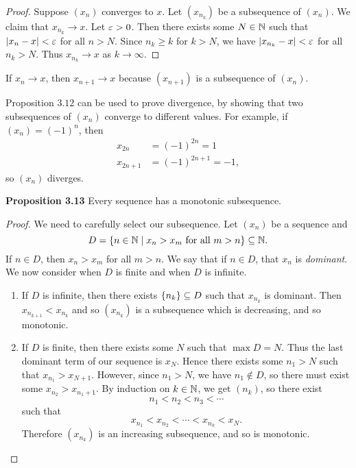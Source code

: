 \documentclass[class=article, crop=false]{standalone}
\begin{document}
  \begin{proof}
    Suppose $(x_n)$ converges to $x$. Let $(x_{n_k})$ be a subsequence of $(x_n)$. We claim that $x_{n_k}\to x$. Let $\varepsilon > 0$. Then there exists some $N\in\mathbb{N}$ such that $\left\lvert x_n - x \right\rvert < \varepsilon$ for all $n > N$. Since $n_k\geq k$ for $k > N$, we have $\left\lvert x_{n_k} - x \right\rvert < \varepsilon$ for all $n_k > N$. Thus $x_{n_k}\to x$ as $k\to \infty$.
  \end{proof}
  \begin{note}{}
    If $x_n\to x$, then $x_{n + 1}\to x$ because $(x_{n + 1})$ is a subsequence of $(x_n)$.
  \end{note}
  \begin{note}{}
    Proposition $3.12$ can be used to prove divergence, by showing that two subsequences of $(x_n)$ converge to different values. For example, if $(x_n) = (-1)^n$, then
    \begin{align*}
      x_{2n} &= (-1)^{2n} = 1 \\
      x_{2n + 1} &= (-1)^{2n + 1} = -1,
    \end{align*}
    so $(x_n)$ diverges.
  \end{note}
  \textbf{Proposition 3.13} Every sequence has a monotonic subsequence.
  \begin{proof}
    We need to carefully select our subsequence. Let $(x_n)$ be a sequence and
    \[
      D = \left\{n\in\mathbb{N} \mid x_n > x_m \text{ for all }m > n\right\}\subseteq \mathbb{N}.
    \]
    If $n\in D$, then $x_n > x_m$ for all $m > n$. We say that if $n\in D$, that $x_n$ is \emph{dominant}. We now consider when $D$ is finite and when $D$ is infinite.
    \begin{enumerate}
      \item If $D$ is infinite, then there exists $\left\{n_k\right\}\subseteq D$ such that $x_{n_k}$ is dominant. Then $x_{n_{k + 1}} < x_{n_k}$ and so $(x_{n_k})$ is a subsequence which is decreasing, and so monotonic.
      \item If $D$ is finite, then there exists some $N$ such that $\max D = N$. Thus the last dominant term of our sequence is $x_N$. Hence there exists some $n_1 > N$ such that $x_{n_1} > x_{N + 1}$. However, since $n_1 > N$, we have $n_1\notin D$, so there must exist some $x_{n_2} > x_{n_1 + 1}$. By induction on $k\in\mathbb{N}$, we get $(n_k)$, so there exist
      \[
        n_1 < n_2 < n_3 < \dotsb
      \]
      such that
      \[
        x_{n_1} < x_{n_2} < \dotsb < x_{n_k} < x_N.
      \]
      Therefore $(x_{n_k})$ is an increasing subsequence, and so is monotonic.
    \end{enumerate}
  \end{proof}
\end{document}
